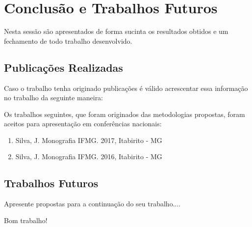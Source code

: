 
\chapter{Conclusão e Trabalhos Futuros}\label{conclusao}

Nesta sessão são apresentados de forma sucinta os resultados obtidos e um fechamento de todo trabalho desenvolvido.



\section{Publicações Realizadas}\label{publicacoes}

Caso o trabalho tenha originado publicações é válido acrescentar essa informação no trabalho da seguinte maneira:

Os trabalhos seguintes, que foram originados das metodologias propostas, foram aceitos para apresentação em conferências nacionais:

\begin{enumerate}
   \item Silva, J. Monografia IFMG. 2017, Itabirito - MG
   \item Silva, J. Monografia IFMG. 2016, Itabirito - MG  
\end{enumerate}

\section{Trabalhos Futuros}\label{trabalhosFuturos}

Apresente propostas para a continuação do seu trabalho....

\vspace{4cm}
\begin{center}
    \Large Bom trabalho! 
    
    \dSmiley[5][yellow]
\end{center}